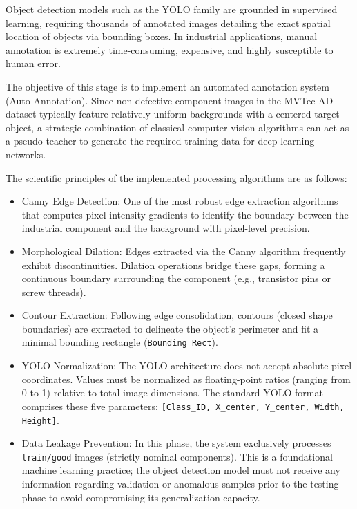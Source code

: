\documentclass{article}
\begin{document}
Object detection models such as the YOLO family are grounded in supervised learning, requiring thousands of annotated images detailing the exact spatial location of objects via bounding boxes. In industrial applications, manual annotation is extremely time-consuming, expensive, and highly susceptible to human error.

The objective of this stage is to implement an automated annotation system (Auto-Annotation). Since non-defective component images in the MVTec AD dataset typically feature relatively uniform backgrounds with a centered target object, a strategic combination of classical computer vision algorithms can act as a pseudo-teacher to generate the required training data for deep learning networks.

The scientific principles of the implemented processing algorithms are as follows:

\begin{itemize}
	\item Canny Edge Detection: One of the most robust edge extraction algorithms that computes pixel intensity gradients to identify the boundary between the industrial component and the background with pixel-level precision.
	\item Morphological Dilation: Edges extracted via the Canny algorithm frequently exhibit discontinuities. Dilation operations bridge these gaps, forming a continuous boundary surrounding the component (e.g., transistor pins or screw threads).
	\item Contour Extraction: Following edge consolidation, contours (closed shape boundaries) are extracted to delineate the object's perimeter and fit a minimal bounding rectangle (\texttt{Bounding Rect}).
	\item YOLO Normalization: The YOLO architecture does not accept absolute pixel coordinates. Values must be normalized as floating-point ratios (ranging from 0 to 1) relative to total image dimensions. The standard YOLO format comprises these five parameters: \texttt{[Class\_ID, X\_center, Y\_center, Width, Height]}.
	\item Data Leakage Prevention: In this phase, the system exclusively processes \texttt{train/good} images (strictly nominal components). This is a foundational machine learning practice; the object detection model must not receive any information regarding validation or anomalous samples prior to the testing phase to avoid compromising its generalization capacity.
\end{itemize}
\end{document}

